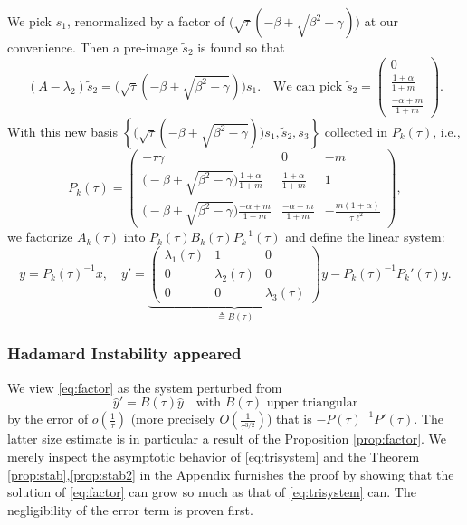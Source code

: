 \documentclass[a4paper,11pt]{article}
\def\l{{\ell}}
\theoremstyle{remark}
\begin{document}
We pick $s_1$, renormalized by a factor of $\Big(\sqrt{\tau}(-\beta+\sqrt{\beta^2-\gamma})\Big)$ at our convenience. Then a pre-image $\tilde s_2$ is found so that
$$ (A-\lambda_2) \tilde s_2 = \Big(\sqrt{\tau}(-\beta+\sqrt{\beta^2-\gamma})\Big)s_1. \quad \text{We can pick $\tilde s_2 = \begin{pmatrix}  0 \\ \tfrac{1+\alpha}{1+m} \\ \tfrac{-\alpha+m}{1+m} \end{pmatrix}$}.$$
With this new basis $\left\{\Big(\sqrt{\tau}(-\beta+\sqrt{\beta^2-\gamma})\Big)s_1,\tilde s_2, s_3 \right\}$ collected in $P_k(\tau)$, i.e.,
\begin{equation*}
 P_k(\tau) = \begin{pmatrix} -\tau\gamma& 0 & -m\\ \Big(-\beta+\sqrt{\beta^2-\gamma}\Big)\frac{1+\alpha}{1+m} & \frac{1+\alpha}{1+m} & 1\\ \Big(-\beta+\sqrt{\beta^2-\gamma}\Big)\frac{-\alpha+m}{1+m} & \frac{-\alpha+m}{1+m} & -\frac{m(1+\alpha)}{\tau\l^2}\end{pmatrix},
\end{equation*}
we factorize $A_k(\tau)$ into  $P_k(\tau)B_k(\tau)P_k^{-1}(\tau)$ and define the linear system:
\begin{equation}
 y = P_k(\tau)^{-1} x, \quad  y' = \underbrace{\begin{pmatrix} \lambda_1(\tau) & 1 & 0\\0 & \lambda_2(\tau) & 0\\0 & 0 & \lambda_3(\tau)\end{pmatrix}}_{\triangleq B(\tau)} y - P_k(\tau)^{-1}P_k'(\tau) y. \label{eq:factor}
\end{equation}


\subsubsection{Hadamard Instability appeared}

We view \eqref{eq:factor} as the system perturbed from
\begin{equation} \label{eq:trisystem}
  \hat{y}' = B(\tau)\hat{y} \quad \text{with $B(\tau)$ upper triangular}
\end{equation}
by the error of $o(\frac{1}{\tau})$ (more precisely $O(\frac{1}{\tau^{3/2}})$) that is $- P(\tau)^{-1}P'(\tau)$. The latter size estimate is in particular a result of the Proposition \ref{prop:factor}. We merely inspect the asymptotic behavior of \eqref{eq:trisystem} and the Theorem \ref{prop:stab},\ref{prop:stab2} in the Appendix furnishes the proof by showing that the solution of \eqref{eq:factor} can grow so much as that of \eqref{eq:trisystem} can. The negligibility of the error term is proven first. %
\end{document}
